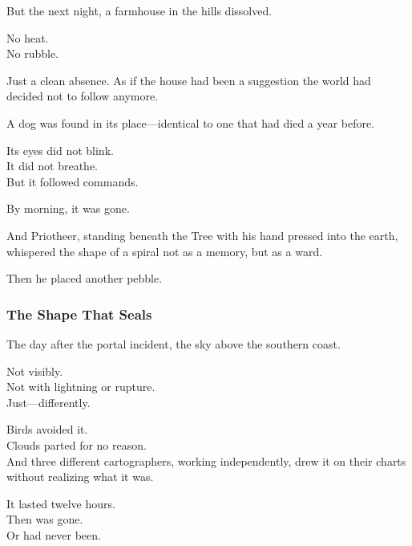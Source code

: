 \documentclass[12pt]{article}
\begin{document}
\vspace{0.5em}
But the next night, a farmhouse in the hills dissolved.

\vspace{0.5em}
No heat.\\
No rubble.

\vspace{0.5em}
Just a clean absence. As if the house had been a suggestion the world had decided not to follow anymore.

\vspace{0.5em}
A dog was found in its place---identical to one that had died a year before.

\vspace{0.5em}
Its eyes did not blink.\\
It did not breathe.\\
But it followed commands.

\vspace{0.5em}
By morning, it was gone.

\vspace{0.5em}
And Priotheer, standing beneath the Tree with his hand pressed into the earth, whispered the shape of a spiral not as a memory, but as a ward.

\vspace{0.5em}
Then he placed another pebble.

\dotfill

\subsubsection*{The Shape That Seals}

The day after the portal incident, the sky above the southern coast.

\vspace{0.5em}
Not visibly.\\
Not with lightning or rupture.\\
Just---differently.

\vspace{0.5em}
Birds avoided it.\\
Clouds parted for no reason.\\
And three different cartographers, working independently, drew it on their charts without realizing what it was.

\vspace{0.5em}
It lasted twelve hours.\\
Then was gone.\\
Or had never been.
\end{document}
